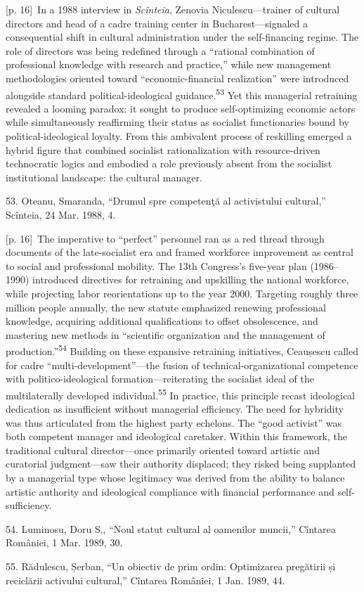 \documentclass[10pt,a4paper]{article}
\begin{document}
{\scriptsize\color{gray} [p. 16]}\ In a 1988 interview in \textit{Scînteia}, Zenovia Niculescu—trainer of cultural directors and head of a cadre training center in Bucharest—signaled a consequential shift in cultural administration under the self-financing regime. The role of directors was being redefined through a “rational combination of professional knowledge with research and practice,” while new management methodologies oriented toward “economic-financial realization” were introduced alongside standard political-ideological guidance.\nobreak\textsuperscript{53} Yet this managerial retraining revealed a looming paradox: it sought to produce self-optimizing economic actors while simultaneously reaffirming their status as socialist functionaries bound by political-ideological loyalty. From this ambivalent process of reskilling emerged a hybrid figure that combined socialist rationalization with resource-driven technocratic logics and embodied a role previously absent from the socialist institutional landscape: the cultural manager.\par{\small 53. Oteanu, Smaranda, “Drumul spre competenţă al activistului cultural,” Scînteia, 24 Mar. 1988, 4.\par}
{\scriptsize\color{gray} [p. 16]}\ The imperative to “perfect” personnel ran as a red thread through documents of the late-socialist era and framed workforce improvement as central to social and professional mobility. The 13th Congress’s five-year plan (1986–1990) introduced directives for retraining and upskilling the national workforce, while projecting labor reorientations up to the year 2000. Targeting roughly three million people annually, the new statute emphasized renewing professional knowledge, acquiring additional qualifications to offset obsolescence, and mastering new methods in “scientific organization and the management of production.”\nobreak\textsuperscript{54} Building on these expansive retraining initiatives, Ceaușescu called for cadre “multi-development”—the fusion of technical-organizational competence with politico-ideological formation—reiterating the socialist ideal of the multilaterally developed individual.\nobreak\textsuperscript{55} In practice, this principle recast ideological dedication as insufficient without managerial efficiency. The need for hybridity was thus articulated from the highest party echelons. The “good activist” was both competent manager and ideological caretaker. Within this framework, the traditional cultural director—once primarily oriented toward artistic and curatorial judgment—saw their authority displaced; they risked being supplanted by a managerial type whose legitimacy was derived from the ability to balance artistic authority and ideological compliance with financial performance and self-sufficiency.\par{\small 54. Luminosu, Doru S., “Noul statut cultural al oamenilor muncii,” Cîntarea României, 1 Mar. 1989, 30.\par}{\small 55. Rădulescu, Șerban, “Un obiectiv de prim ordin: Optimizarea pregătirii și reciclării activului cultural,” Cîntarea României, 1 Jan. 1989, 44.\par}
\end{document}

